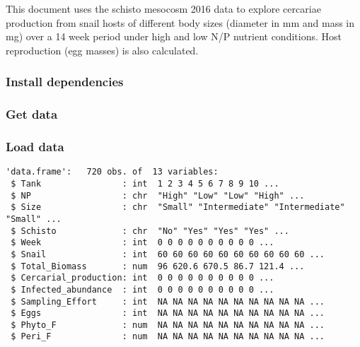 \documentclass[10,portrait]{article}
\newenvironment{Shaded}{\begin{snugshade}}{\end{snugshade}}
\newcommand{\KeywordTok}[1]{\textcolor[rgb]{0.13,0.29,0.53}{\textbf{#1}}}
\newcommand{\StringTok}[1]{\textcolor[rgb]{0.31,0.60,0.02}{#1}}
\newcommand{\CommentTok}[1]{\textcolor[rgb]{0.56,0.35,0.01}{\textit{#1}}}
\newcommand{\OperatorTok}[1]{\textcolor[rgb]{0.81,0.36,0.00}{\textbf{#1}}}
\newcommand{\NormalTok}[1]{#1}
\begin{document}
This document uses the schisto mesocosm 2016 data to explore cercariae
production from snail hosts of different body sizes (diameter in mm and
mass in mg) over a 14 week period under high and low N/P nutrient
conditions. Host reproduction (egg masses) is also calculated.

\subsubsection{Install dependencies}\label{install-dependencies}

\subsubsection{Get data}\label{get-data}

\begin{Shaded}
\end{Shaded}

\subsubsection{Load data}\label{load-data}

\begin{verbatim}
'data.frame':   720 obs. of  13 variables:
 $ Tank                : int  1 2 3 4 5 6 7 8 9 10 ...
 $ NP                  : chr  "High" "Low" "Low" "High" ...
 $ Size                : chr  "Small" "Intermediate" "Intermediate" "Small" ...
 $ Schisto             : chr  "No" "Yes" "Yes" "Yes" ...
 $ Week                : int  0 0 0 0 0 0 0 0 0 0 ...
 $ Snail               : int  60 60 60 60 60 60 60 60 60 60 ...
 $ Total_Biomass       : num  96 620.6 670.5 86.7 121.4 ...
 $ Cercarial_production: int  0 0 0 0 0 0 0 0 0 0 ...
 $ Infected_abundance  : int  0 0 0 0 0 0 0 0 0 0 ...
 $ Sampling_Effort     : int  NA NA NA NA NA NA NA NA NA NA ...
 $ Eggs                : int  NA NA NA NA NA NA NA NA NA NA ...
 $ Phyto_F             : num  NA NA NA NA NA NA NA NA NA NA ...
 $ Peri_F              : num  NA NA NA NA NA NA NA NA NA NA ...
\end{verbatim}
\end{document}
